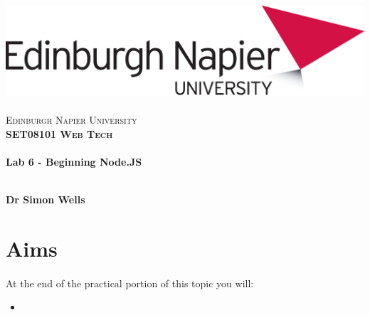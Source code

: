 \documentclass[10pt, a4paper, twosize]{article}
\begin{document}

\begin{titlepage}
\vspace*{5cm}
\begin{center}
\includegraphics[width=.5\textwidth]{images/EdNapUniLogoCMYK}~\\[1cm]

\textsc{\Large Edinburgh Napier University}\\[1.5cm]

\textsc{\LARGE \bfseries SET08101 Web Tech}\\[0.5cm]

\hrulefill \\[0.4cm]
{\huge \bfseries Lab 6 - Beginning Node.JS\\[0.4cm]}
\hrulefill \\[1.5cm]

\begin{minipage}{0.4\textwidth}
\begin{flushleft} \large
\textbf{Dr Simon Wells} \\
\end{flushleft}
\end{minipage}

\vfill

\end{center}
\end{titlepage}




%

\section{Aims}
\paragraph{} At the end of the practical portion of this topic you will:

\begin{itemize}
\item 
\end{itemize}
\end{document}
